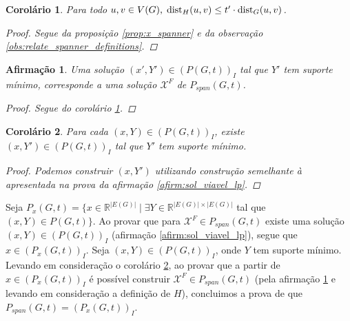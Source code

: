 \documentclass[11pt,reqno]{amsart}
\newcommand{\dist}{{\rm dist}}
\newtheorem{afirmacao}{Afirmação}[teorema]
\newtheorem{corolario}{Corolário}
\newcommand{\incid}{\mathcal{X}}
\newcommand{\espacoX}{\mathbb{R}^{|E(G)|}}
\newcommand{\espacoY}{\mathbb{R}^{|E(G)| \times |E(G)|}}
\begin{document}
\begin{corolario}
\label{corol:standard_spanner}
Para todo $u,v \in V(G),\;\dist_{H}(u,v) \le t' \cdot \dist_{G}(u,v)$.
\begin{proof}
Segue da proposição \ref{prop:x_spanner} e da observação 
\ref{obs:relate_spanner_definitions}.
\end{proof}
\end{corolario}


\begin{afirmacao}
\label{afirm:sol_viavel_Pspan}
Uma solução $(x',Y') \in (P(G,t))_{I}$ tal que $Y'$ tem suporte mínimo, corresponde a 
uma solução $\incid^{F}$ de $P_{span}(G,t)$.
\begin{proof}
Segue do corolário \ref{corol:standard_spanner}.
\end{proof}
\end{afirmacao}

\begin{corolario}
\label{corol:Y_suporte_minimo}
Para cada $(x,Y) \in (P(G,t))_{I}$, existe $(x,Y') \in (P(G,t))_{I}$ tal que $Y'$ tem suporte 
mínimo.
\begin{proof}
Podemos construir $(x,Y')$ utilizando construção semelhante à apresentada na prova 
da afirmação \ref{afirm:sol_viavel_lp}.
\end{proof}
\end{corolario}

Seja $P_x(G,t) = \{x \in \espacoX\; |\; \exists Y \in \espacoY$ tal que 
$(x,Y) \in P(G,t)\}$. Ao provar que para $\incid^{F} \in P_{span}(G,t)$ existe uma 
solução $(x,Y) \in (P(G,t))_{I}$ (afirmação \ref{afirm:sol_viavel_lp}), segue que 
$x \in (P_x(G,t))_{I}$. Seja $(x,Y) \in (P(G,t))_{I}$, onde $Y$ tem suporte 
mínimo. Levando em consideração o corolário \ref{corol:Y_suporte_minimo}, ao 
provar que a partir de $x \in (P_x(G,t))_{I}$ 
é possível construir $\incid^{F} \in P_{span}(G,t)$ (pela afirmação 
\ref{afirm:sol_viavel_Pspan} e levando em consideração a definição de $H$),
 concluimos a prova de que $P_{span}(G,t) = (P_x(G,t))_{I}$.
\end{document}
